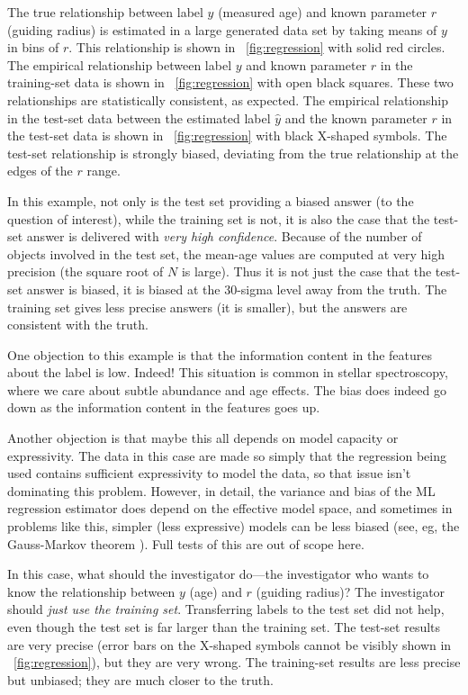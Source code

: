 \documentclass[10pt]{article}
\newcommand{\figref}[1]{\figurename~\ref{#1}}
\begin{document}
The true relationship between label $y$ (measured age) and known parameter $r$ (guiding radius) is estimated in a large generated data set by taking means of $y$ in bins of $r$.
This relationship is shown in \figref{fig:regression} with solid red circles.
The empirical relationship between label $y$ and known parameter $r$ in the training-set data is shown in \figref{fig:regression} with open black squares.
These two relationships are statistically consistent, as expected.
The empirical relationship in the test-set data between the estimated label $\hat{y}$ and the known parameter $r$ in the test-set data is shown in \figref{fig:regression} with black X-shaped symbols.
The test-set relationship is strongly biased, deviating from the true relationship at the edges of the $r$ range.

In this example, not only is the test set providing a biased answer (to the question of interest), while the training set is not, it is also the case that the test-set answer is delivered with \emph{very high confidence}.
Because of the number of objects involved in the test set, the mean-age values are computed at very high precision (the square root of $N$ is large).
Thus it is not just the case that the test-set answer is biased, it is biased at the 30-sigma level away from the truth.
The training set gives less precise answers (it is smaller), but the answers are consistent with the truth.

One objection to this example is that the information content in the features about the label is low.
Indeed! This situation is common in stellar spectroscopy, where we care about subtle abundance and age effects.
The bias does indeed go down as the information content in the features goes up.

Another objection is that maybe this all depends on model capacity or expressivity.
The data in this case are made so simply that the regression being used contains sufficient expressivity to model the data, so that issue isn't dominating this problem.
However, in detail, the variance and bias of the ML regression estimator does depend on the effective model space, and sometimes in problems like this, simpler (less expressive) models can be less biased (see, eg, the Gauss-Markov theorem \citealt{gauss_markov}).
Full tests of this are out of scope here.

In this case, what should the investigator do---the investigator who wants to know the relationship between $y$ (age) and $r$ (guiding radius)?
The investigator should \emph{just use the training set}.
Transferring labels to the test set did not help, even though the test set is far larger than the training set.
The test-set results are very precise (error bars on the X-shaped symbols cannot be visibly shown in \figref{fig:regression}), but they are very wrong.
The training-set results are less precise but unbiased; they are much closer to the truth.
\end{document}
